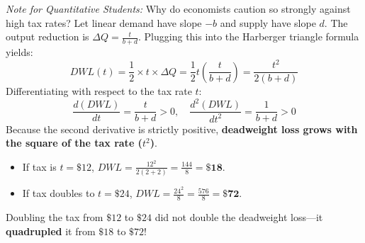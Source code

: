 \documentclass[11pt,letterpaper]{article}
\begin{document}
\begin{tcolorbox}[colback=orange!5!white,colframe=orange!75!black,title=\textbf{Optional Advanced Section: The Quadratic Excess Burden Theorem}]
\small
\emph{Note for Quantitative Students:}
Why do economists caution so strongly against high tax rates? Let linear demand have slope $-b$ and supply have slope $d$. The output reduction is $\Delta Q = \frac{t}{b + d}$. Plugging this into the Harberger triangle formula yields:
\[
DWL(t) = \frac{1}{2} \times t \times \Delta Q = \frac{1}{2} t \left( \frac{t}{b + d} \right) = \frac{t^2}{2(b + d)}
\]
Differentiating with respect to the tax rate $t$:
\[
\frac{d(DWL)}{dt} = \frac{t}{b + d} > 0, \quad \frac{d^2(DWL)}{dt^2} = \frac{1}{b + d} > 0
\]
Because the second derivative is strictly positive, \textbf{deadweight loss grows with the square of the tax rate ($t^2$)}. 
\begin{itemize}
    \item If tax is $t = \$12$, $DWL = \frac{12^2}{2(2+2)} = \frac{144}{8} = \mathbf{\$18}$.
    \item If tax doubles to $t = \$24$, $DWL = \frac{24^2}{8} = \frac{576}{8} = \mathbf{\$72}$.
\end{itemize}
Doubling the tax from $\$12$ to $\$24$ did not double the deadweight loss—it \textbf{quadrupled} it from $\$18$ to $\$72$!
\end{tcolorbox}
\end{document}
